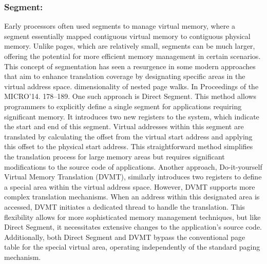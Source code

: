 
\subsubsection{Segment:}
Early processors often used segments to manage virtual memory, where a segment essentially mapped contiguous 
virtual memory to contiguous physical memory. Unlike pages, which are relatively small, segments can be much 
larger, offering the potential for more efficient memory management in certain scenarios. 
This concept of segmentation has seen a resurgence in some modern approaches that aim to enhance 
translation coverage by designating specific areas in the virtual address space.
dimensionality of nested page walks. In Proceedings of the MICRO’14. 178–189.
One such approach is Direct Segment. This method allows programmers to explicitly define 
a single segment for applications requiring significant memory. It introduces two new 
registers to the system, which indicate the start and end of this segment. 
Virtual addresses within this segment are translated by calculating 
the offset from the virtual start address and applying this offset to the 
physical start address. This straightforward method simplifies the translation 
process for large memory areas but requires significant modifications to the 
source code of applications.
Another approach, Do-it-yourself Virtual Memory Translation (DVMT), similarly 
introduces two registers to define a special area within the virtual address space. 
However, DVMT supports more complex translation mechanisms. When an address 
within this designated area is accessed, DVMT initiates a dedicated 
thread to handle the translation. This flexibility allows for more 
sophisticated memory management techniques, but like Direct Segment, 
it necessitates extensive changes to the application's source code. 
Additionally, both Direct Segment and DVMT bypass the conventional page table 
for the special virtual area, operating independently of the standard 
paging mechanism.

